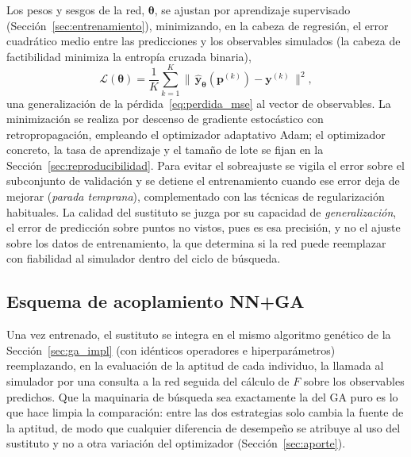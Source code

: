 Los pesos y sesgos de la red, $\boldsymbol{\theta}$, se ajustan por aprendizaje
supervisado (Sección~\ref{sec:entrenamiento}), minimizando, en la cabeza de regresión, el error cuadrático medio
entre las predicciones y los observables simulados (la cabeza de factibilidad minimiza
la entropía cruzada binaria),
%
\begin{equation}
    \mathcal{L}(\boldsymbol{\theta})
    = \frac{1}{K}\sum_{k=1}^{K}
    \bigl\lVert\, \hat{\mathbf{y}}_{\boldsymbol{\theta}}(\mathbf{p}^{(k)})
    - \mathbf{y}^{(k)} \,\bigr\rVert^2,
    \label{eq:nnga_perdida}
\end{equation}
%
una generalización de la pérdida~\eqref{eq:perdida_mse} al vector de observables. La
minimización se realiza por descenso de gradiente estocástico con
retropropagación, empleando el optimizador adaptativo Adam; el
optimizador concreto, la tasa de aprendizaje y el tamaño de lote se fijan en la
Sección~\ref{sec:reproducibilidad}. Para evitar el sobreajuste se vigila el error
sobre el subconjunto de validación y se detiene el entrenamiento cuando ese error
deja de mejorar (\emph{parada temprana}), complementado con las técnicas de
regularización habituales. La calidad del sustituto se juzga por su capacidad de
\emph{generalización}, el error de predicción sobre puntos no vistos, pues es esa
precisión, y no el ajuste sobre los datos de entrenamiento, la que determina si la
red puede reemplazar con fiabilidad al simulador dentro del ciclo de búsqueda.

\subsection{Esquema de acoplamiento NN+GA}
\label{sec:nnga_acoplamiento}

Una vez entrenado, el sustituto se integra en el mismo algoritmo genético de la
Sección~\ref{sec:ga_impl} (con idénticos operadores e hiperparámetros) reemplazando,
en la evaluación de la aptitud de cada individuo, la llamada al simulador por una
consulta a la red seguida del cálculo de $F$ sobre los observables predichos. Que la
maquinaria de búsqueda sea exactamente la del GA puro es lo que hace limpia la
comparación: entre las dos estrategias solo cambia la fuente de la aptitud, de modo
que cualquier diferencia de desempeño se atribuye al uso del sustituto y no a otra
variación del optimizador (Sección~\ref{sec:aporte}).

